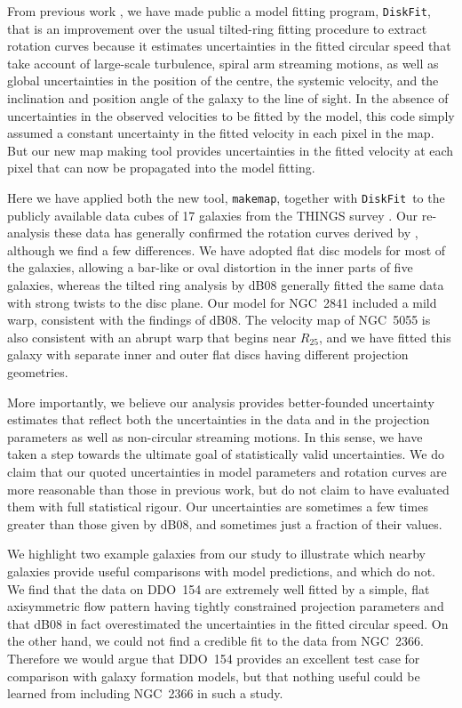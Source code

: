 \documentclass[letterpaper,fleqn,usenatbib]{mnras}
\def\DFt{{\tt DiskFit}}
\def\mkm{{\tt makemap}}
\begin{document}
From previous work \citep{SS07, SZS10}, we have made public a model
fitting program, \DFt, that is an improvement over the usual
tilted-ring fitting procedure to extract rotation curves because it
estimates uncertainties in the fitted circular speed that take account
of large-scale turbulence, spiral arm streaming motions, as well as
global uncertainties in the position of the centre, the systemic
velocity, and the inclination and position angle of the galaxy to the
line of sight.  In the absence of uncertainties in the observed
velocities to be fitted by the model, this code simply assumed a
constant uncertainty in the fitted velocity in each pixel in the map.
But our new map making tool provides uncertainties in the fitted
velocity at each pixel that can now be propagated into the model
fitting.

Here we have applied both the new tool, \mkm, together with \DFt\ to
the publicly available data cubes of 17 galaxies from the THINGS
survey \citep{Wa08}.  Our re-analysis these data has generally
confirmed the rotation curves derived by \citet{deB08}, although we
find a few differences.  We have adopted flat disc models for most of
the galaxies, allowing a bar-like or oval distortion in the inner
parts of five galaxies, whereas the tilted ring analysis by dB08
generally fitted the same data with strong twists to the disc plane.
Our model for NGC~2841 included a mild warp, consistent with the
findings of dB08.  The velocity map of NGC~5055 is also consistent
with an abrupt warp that begins near $R_{25}$, and we have fitted this
galaxy with separate inner and outer flat discs having different
projection geometries.

More importantly, we believe our analysis provides better-founded
uncertainty estimates that reflect both the uncertainties in the data
and in the projection parameters as well as non-circular streaming
motions.  In this sense, we have taken a step towards the ultimate
goal of statistically valid uncertainties.  We do claim that our
quoted uncertainties in model parameters and rotation curves are more
reasonable than those in previous work, but do not claim to have
evaluated them with full statistical rigour.  Our uncertainties are
sometimes a few times greater than those given by dB08, and sometimes
just a fraction of their values.

We highlight two example galaxies from our study to illustrate which
nearby galaxies provide useful comparisons with model predictions, and
which do not.  We find that the data on DDO~154 are extremely well
fitted by a simple, flat axisymmetric flow pattern having tightly
constrained projection parameters and that dB08 in fact overestimated
the uncertainties in the fitted circular speed.  On the other hand, we
could not find a credible fit to the data from NGC~2366.  Therefore we
would argue that DDO~154 provides an excellent test case for
comparison with galaxy formation models, but that nothing useful could
be learned from including NGC~2366 in such a study.
\end{document}
